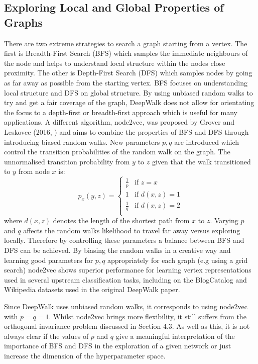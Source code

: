 \documentclass[a4paper]{article}
\begin{document}
\subsection{Exploring Local and Global Properties of Graphs}
There are two extreme strategies to search a graph starting from a vertex. The
first is Breadth-First Search (BFS) which samples the immediate neighbours of
the node and helps to understand local structure within the nodes close
proximity. The other is Depth-First Search (DFS) which samples nodes by going as
far away as possible from the starting vertex. BFS focuses on understanding
local structure and DFS on global structure. By using unbiased random walks to
try and get a fair coverage of the graph, DeepWalk does not allow for
orientating the focus to a depth-first or breadth-first approach which is useful
for many applications. A different algorithm, node2vec, was proposed by Grover
and Leskovec (2016, \cite{grover_leskovec2016}) and aims to combine the
properties of BFS and DFS through introducing biased random walks. New
parameters $p,q$ are introduced which control the transition probabilities of
the random walk on the graph. The unnormalised transition probability from $y$
to $z$ given that the walk transitioned to $y$ from node $x$ is:
\begin{equation*}
  p_x(y,z)= 
  \begin{cases}
    \frac{1}{p}& \text{if } z = x\\
    1          & \text{if } d(x,z) = 1\\
    \frac{1}{q}& \text{if } d(x,z) = 2\\
  \end{cases}
\end{equation*}
where $d(x,z)$ denotes the length of the shortest path from $x$ to $z$. Varying $p$ and $q$ affects the random walks likelihood to travel far away
versus exploring locally. Therefore by controlling these parameters a balance
between BFS and DFS can be achieved. By biasing the random walks in a creative
way and learning good parameters for $p,q$ appropriately for each graph (e.g
using a grid search) node2vec shows superior performance for learning vertex
representations used in several upstream classification tasks, including on
the BlogCatalog and Wikipedia datasets used in the original DeepWalk paper.

Since DeepWalk uses unbiased random walks, it corresponds to using node2vec with $p=q=1$. Whilst node2vec brings
more flexibility, it still suffers from the orthogonal invariance problem discussed in Section 4.3. As well as this, it is not always clear if the values of $p$ and $q$ give a
meaningful interpretation of the importance of BFS and DFS in the exploration of a given network or just increase the dimension of the hyperparameter space.
\end{document}

